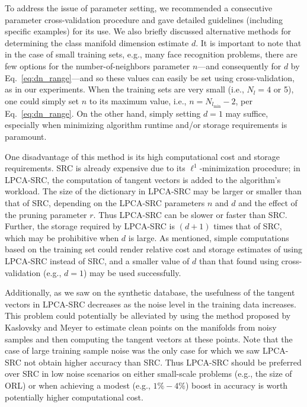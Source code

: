 \documentclass[review]{elsarticle}
\begin{document}
To address the issue of parameter setting, we recommended a consecutive parameter cross-validation procedure and gave detailed guidelines (including specific examples) for its use.
We also briefly discussed alternative methods for determining the class manifold dimension estimate $d$. It is important to note that in the case of small training sets, e.g., many face recognition problems, there are few options for the number-of-neighbors parameter $n$---and consequently for $d$ by Eq.~\eqref{eq:dn_range}---and so these values can easily be set using cross-validation, as in our experiments. When the training sets are very small (i.e., $N_l = 4$ or 5), one could simply set $n$ to its maximum value, i.e., $n=N_{l_\mathrm{min}}-2$, per Eq.~\eqref{eq:dn_range}. On the other hand, simply setting $d=1$ may suffice, especially when minimizing algorithm runtime and/or storage requirements is paramount.

One disadvantage of this method is its high computational cost and storage requirements. SRC is already expensive due to its $\ell^1$-minimization procedure; in LPCA-SRC, the computation of tangent vectors is added to the algorithm's workload. The size of the dictionary in LPCA-SRC may be larger or smaller than that of SRC, depending on the LPCA-SRC parameters $n$ and $d$ and the effect of the pruning parameter $r$. Thus LPCA-SRC can be slower or faster than SRC. Further, the storage required by LPCA-SRC is $(d+1)$ times that of SRC, which may be prohibitive when $d$ is large. As mentioned, simple computations based on the training set could render relative cost and storage estimates of using LPCA-SRC instead of SRC, and a smaller value of $d$ than that found using cross-validation (e.g., $d=1$) may be used successfully. 

Additionally, as we saw on the synthetic database, the usefulness of the tangent vectors in LPCA-SRC decreases as the noise level in the training data increases. This problem could potentially be alleviated by using the method proposed by Kaslovsky and Meyer \cite{mey:tan} to estimate clean points on the manifolds from noisy samples and then computing the tangent vectors at these points. Note that the case of large training sample noise was the only case for which we saw LPCA-SRC not obtain higher accuracy than SRC. Thus LPCA-SRC should be preferred over SRC in low noise scenarios on either small-scale problems (e.g., the size of ORL) or when achieving a modest (e.g., $1\%-4\%$) boost in accuracy is worth potentially higher computational cost.
\end{document}
